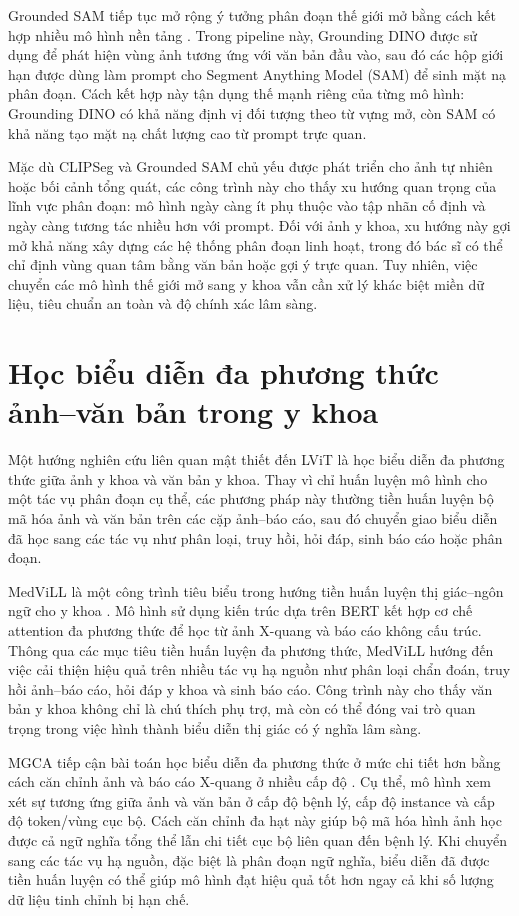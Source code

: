 Grounded SAM tiếp tục mở rộng ý tưởng phân đoạn thế giới mở bằng cách kết hợp nhiều mô hình nền tảng \cite{ren_grounded_2024}. Trong pipeline này, Grounding DINO được sử dụng để phát hiện vùng ảnh tương ứng với văn bản đầu vào, sau đó các hộp giới hạn được dùng làm prompt cho Segment Anything Model (SAM) để sinh mặt nạ phân đoạn. Cách kết hợp này tận dụng thế mạnh riêng của từng mô hình: Grounding DINO có khả năng định vị đối tượng theo từ vựng mở, còn SAM có khả năng tạo mặt nạ chất lượng cao từ prompt trực quan.

Mặc dù CLIPSeg và Grounded SAM chủ yếu được phát triển cho ảnh tự nhiên hoặc bối cảnh tổng quát, các công trình này cho thấy xu hướng quan trọng của lĩnh vực phân đoạn: mô hình ngày càng ít phụ thuộc vào tập nhãn cố định và ngày càng tương tác nhiều hơn với prompt. Đối với ảnh y khoa, xu hướng này gợi mở khả năng xây dựng các hệ thống phân đoạn linh hoạt, trong đó bác sĩ có thể chỉ định vùng quan tâm bằng văn bản hoặc gợi ý trực quan. Tuy nhiên, việc chuyển các mô hình thế giới mở sang y khoa vẫn cần xử lý khác biệt miền dữ liệu, tiêu chuẩn an toàn và độ chính xác lâm sàng.

\section{Học biểu diễn đa phương thức ảnh--văn bản trong y khoa}

Một hướng nghiên cứu liên quan mật thiết đến LViT là học biểu diễn đa phương thức giữa ảnh y khoa và văn bản y khoa. Thay vì chỉ huấn luyện mô hình cho một tác vụ phân đoạn cụ thể, các phương pháp này thường tiền huấn luyện bộ mã hóa ảnh và văn bản trên các cặp ảnh--báo cáo, sau đó chuyển giao biểu diễn đã học sang các tác vụ như phân loại, truy hồi, hỏi đáp, sinh báo cáo hoặc phân đoạn.

MedViLL là một công trình tiêu biểu trong hướng tiền huấn luyện thị giác--ngôn ngữ cho y khoa \cite{moon_multi-modal_2021}. Mô hình sử dụng kiến trúc dựa trên BERT kết hợp cơ chế attention đa phương thức để học từ ảnh X-quang và báo cáo không cấu trúc. Thông qua các mục tiêu tiền huấn luyện đa phương thức, MedViLL hướng đến việc cải thiện hiệu quả trên nhiều tác vụ hạ nguồn như phân loại chẩn đoán, truy hồi ảnh--báo cáo, hỏi đáp y khoa và sinh báo cáo. Công trình này cho thấy văn bản y khoa không chỉ là chú thích phụ trợ, mà còn có thể đóng vai trò quan trọng trong việc hình thành biểu diễn thị giác có ý nghĩa lâm sàng.

MGCA tiếp cận bài toán học biểu diễn đa phương thức ở mức chi tiết hơn bằng cách căn chỉnh ảnh và báo cáo X-quang ở nhiều cấp độ \cite{wang_multi-granularity_2022}. Cụ thể, mô hình xem xét sự tương ứng giữa ảnh và văn bản ở cấp độ bệnh lý, cấp độ instance và cấp độ token/vùng cục bộ. Cách căn chỉnh đa hạt này giúp bộ mã hóa hình ảnh học được cả ngữ nghĩa tổng thể lẫn chi tiết cục bộ liên quan đến bệnh lý. Khi chuyển sang các tác vụ hạ nguồn, đặc biệt là phân đoạn ngữ nghĩa, biểu diễn đã được tiền huấn luyện có thể giúp mô hình đạt hiệu quả tốt hơn ngay cả khi số lượng dữ liệu tinh chỉnh bị hạn chế.

